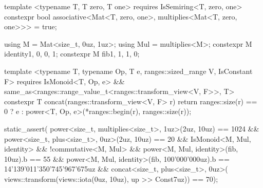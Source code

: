 \begin{listing}[htbp]
\begin{minipage}[t]{0.48\linewidth}
\begin{cpp}
template <typename T, T zero, T one>
  requires IsSemiring<T, zero, one>
constexpr bool associative<Mat<T, zero, one>,
    multiplies<Mat<T, zero, one>>> = true;

using M = Mat<size_t, 0uz, 1uz>;
using Mul = multiplies<M>;
constexpr M identity{1, 0, 0, 1};
constexpr M fib{1, 1, 1, 0};
\end{cpp}
\end{minipage}
\vspace{-6pt}
\begin{cpp}
template <typename T, typename Op, T e, ranges::sized_range V, IsConstant F>
  requires IsMonoid<T, Op, e> &&
           same_as<ranges::range_value_t<ranges::transform_view<V, F>>, T>
constexpr T concat(ranges::transform_view<V, F> r) {
  return ranges::size(r) == 0 ? e : power<T, Op, e>(*ranges::begin(r), ranges::size(r)); }

static_assert(
    power<size_t, multiplies<size_t>, 1uz>(2uz, 10uz) == 1024 &&
    power<size_t, plus<size_t>, 0uz>(2uz, 10uz) == 20 &&
    IsMonoid<M, Mul, identity> && !commutative<M, Mul> &&
    power<M, Mul, identity>(fib, 10uz).b == 55 &&
    power<M, Mul, identity>(fib, 100'000'000uz).b == 14'139'011'350'745'967'675uz &&
    concat<size_t, plus<size_t>, 0uz>(
        views::transform(views::iota(0uz, 10uz), up >> Const{7uz})) == 70);
\end{cpp}
\caption{A declared law, a law inferred from it, and the faster overload they license.
Top: two more laws, and a semiring as a shape.
Middle: the power of a monoid in as many steps as the count has bits, and the $2 \times 2$ matrices over a semiring.
Bottom:  over the image of a constant arrow as that power.}
\label{lst:laws}
\end{listing}

